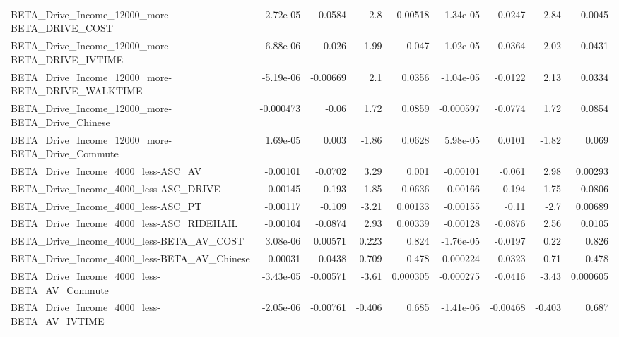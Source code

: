 \begin{tabular}{lrrrrrrrr}
BETA\_Drive\_Income\_12000\_more-BETA\_DRIVE\_COST       &   -2.72e-05 &      -0.0584 &      2.8 &  0.00518 &  -1.34e-05 &     -0.0247 &         2.84 &        0.0045 \\
BETA\_Drive\_Income\_12000\_more-BETA\_DRIVE\_IVTIME     &   -6.88e-06 &       -0.026 &     1.99 &    0.047 &   1.02e-05 &      0.0364 &         2.02 &        0.0431 \\
BETA\_Drive\_Income\_12000\_more-BETA\_DRIVE\_WALKTIME   &   -5.19e-06 &     -0.00669 &      2.1 &   0.0356 &  -1.04e-05 &     -0.0122 &         2.13 &        0.0334 \\
BETA\_Drive\_Income\_12000\_more-BETA\_Drive\_Chinese    &   -0.000473 &        -0.06 &     1.72 &   0.0859 &  -0.000597 &     -0.0774 &         1.72 &        0.0854 \\
BETA\_Drive\_Income\_12000\_more-BETA\_Drive\_Commute    &    1.69e-05 &        0.003 &    -1.86 &   0.0628 &   5.98e-05 &      0.0101 &        -1.82 &         0.069 \\
BETA\_Drive\_Income\_4000\_less-ASC\_AV                 &    -0.00101 &      -0.0702 &     3.29 &    0.001 &   -0.00101 &      -0.061 &         2.98 &       0.00293 \\
BETA\_Drive\_Income\_4000\_less-ASC\_DRIVE              &    -0.00145 &       -0.193 &    -1.85 &   0.0636 &   -0.00166 &      -0.194 &        -1.75 &        0.0806 \\
BETA\_Drive\_Income\_4000\_less-ASC\_PT                 &    -0.00117 &       -0.109 &    -3.21 &  0.00133 &   -0.00155 &       -0.11 &         -2.7 &       0.00689 \\
BETA\_Drive\_Income\_4000\_less-ASC\_RIDEHAIL           &    -0.00104 &      -0.0874 &     2.93 &  0.00339 &   -0.00128 &     -0.0876 &         2.56 &        0.0105 \\
BETA\_Drive\_Income\_4000\_less-BETA\_AV\_COST           &    3.08e-06 &      0.00571 &    0.223 &    0.824 &  -1.76e-05 &     -0.0197 &         0.22 &         0.826 \\
BETA\_Drive\_Income\_4000\_less-BETA\_AV\_Chinese        &     0.00031 &       0.0438 &    0.709 &    0.478 &   0.000224 &      0.0323 &         0.71 &         0.478 \\
BETA\_Drive\_Income\_4000\_less-BETA\_AV\_Commute        &   -3.43e-05 &     -0.00571 &    -3.61 & 0.000305 &  -0.000275 &     -0.0416 &        -3.43 &      0.000605 \\
BETA\_Drive\_Income\_4000\_less-BETA\_AV\_IVTIME         &   -2.05e-06 &     -0.00761 &   -0.406 &    0.685 &  -1.41e-06 &    -0.00468 &       -0.403 &         0.687 \\

\end{tabular}
